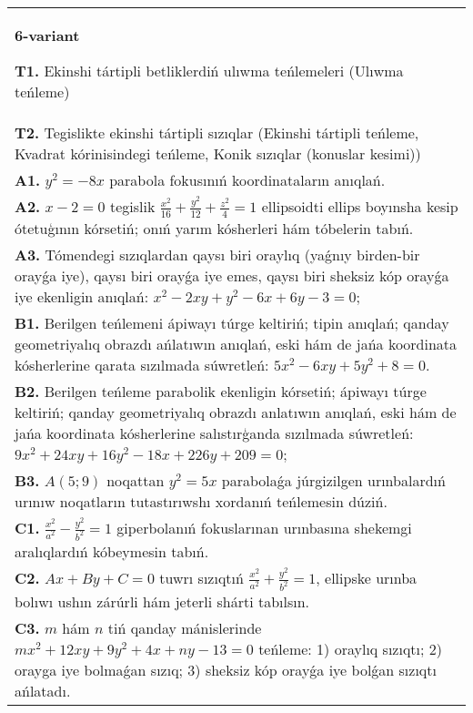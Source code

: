 \documentclass{article}
\begin{document}
\begin{tabular}{m{17cm}}
\textbf{6-variant}
\newline

\textbf{T1.} Ekinshi tártipli betliklerdiń ulıwma teńlemeleri (Ulıwma teńleme) \\
\textbf{T2.} Tegislikte ekinshi tártipli sızıqlar (Ekinshi tártipli teńleme, Kvadrat kórinisindegi teńleme, Konik sızıqlar (konuslar kesimi)) \\
\textbf{A1.} $y^2=-8 x$ parabola fokusınıń koordinataların anıqlań. \\
\textbf{A2.} $x-2=0$ tegislik $\frac{x^2}{16}+\frac{y^2}{12}+\frac{z^2}{4}=1$ ellipsoidti ellips boyınsha kesip ótetuģının kórsetiń; onıń yarım kósherleri hám tóbelerin tabıń. \\
\textbf{A3.} Tómendegi sızıqlardan qaysı biri oraylıq (yaǵnıy birden-bir orayǵa iye), qaysı biri orayǵa iye emes, qaysı biri sheksiz kóp orayǵa iye ekenligin anıqlań:  $x^2-2 x y+y^2-6 x+6 y-3=0$; \\
\textbf{B1.} Berilgen teńlemeni ápiwayı túrge keltiriń; tipin anıqlań; qanday geometriyalıq obrazdı ańlatıwın anıqlań, eski hám de jańa koordinata kósherlerine qarata sızılmada súwretleń: $5 x^2-6 x y+5 y^2+8=0$. \\
\textbf{B2.} Berilgen teńleme parabolik ekenligin kórsetiń; ápiwayı túrge keltiriń; qanday geometriyalıq obrazdı anlatıwın anıqlań, eski hám de jańa koordinata kósherlerine salıstırģanda sızılmada súwretleń: $9 x^2+24 x y+16 y^2-18 x+226 y+209=0$; \\
\textbf{B3.} $A (5;9) $ noqattan $y^2=5x$ parabolaǵa júrgizilgen urınbalardıń urınıw noqatların tutastırıwshı xordanıń teńlemesin dúziń. \\
\textbf{C1.} $\frac{x^2}{a^2}-\frac{y^2}{b^2}=1$ giperbolanıń fokuslarınan urınbasına shekemgi aralıqlardıń kóbeymesin tabıń. \\
\textbf{C2.} $A x+B y+C=0$ tuwrı sızıqtıń $\frac{x^2}{a^2}+\frac{y^2}{b^2}=1$, ellipske urınba bolıwı ushın zárúrli hám jeterli shárti tabılsın. \\
\textbf{C3.} $m$ hám $n$ tiń qanday mánislerinde $m x^2+12 x y+9 y^2+4 x+n y-13=0$ teńleme: 1) oraylıq sızıqtı; 2) orayga iye bolmaǵan sızıq; 3) sheksiz kóp orayǵa iye bolǵan sızıqtı ańlatadı. \\

\end{tabular}
\vspace{1cm}
\end{document}
